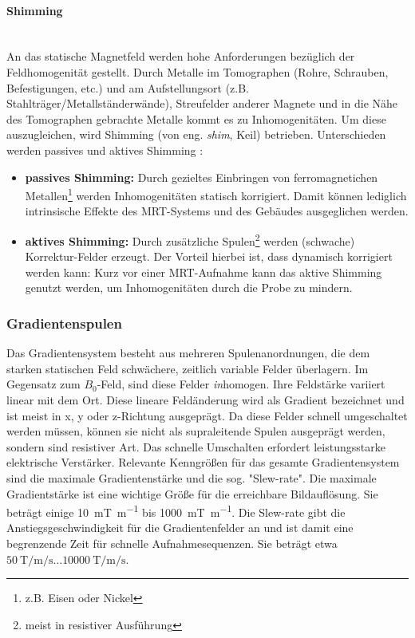 \paragraph{Shimming}\mbox{}\\
An das statische Magnetfeld werden hohe Anforderungen bezüglich der Feldhomogenität gestellt.
Durch Metalle im Tomographen (Rohre, Schrauben, Befestigungen, etc.) und am Aufstellungsort (z.B. Stahlträger/Metallständerwände), Streufelder anderer Magnete und in die Nähe des Tomographen gebrachte Metalle kommt es zu Inhomogenitäten.
Um diese auszugleichen, wird Shimming (von eng. \textit{shim}, Keil) betrieben. Unterschieden werden passives und aktives Shimming \cite{Lipton2008}:
\begin{itemize}
	\item \textbf{passives Shimming:} Durch gezieltes Einbringen von ferromagnetichen Metallen\footnote{z.B. Eisen oder Nickel} werden Inhomogenitäten statisch korrigiert. Damit können lediglich intrinsische Effekte des MRT-Systems und des Gebäudes ausgeglichen werden.
	\item \textbf{aktives Shimming:} Durch zusätzliche Spulen\footnote{meist in resistiver Ausführung} werden (schwache) Korrektur-Felder erzeugt. Der Vorteil hierbei ist, dass dynamisch korrigiert werden kann: Kurz vor einer MRT-Aufnahme kann das aktive Shimming genutzt werden, um Inhomogenitäten  durch die Probe zu mindern.  
\end{itemize}

\subsubsection{Gradientenspulen}
Das Gradientensystem besteht aus mehreren Spulenanordnungen, die dem starken statischen Feld schwächere, zeitlich variable Felder überlagern. Im Gegensatz zum $B_0$-Feld, sind diese Felder \textit{in}homogen. Ihre Feldstärke variiert linear mit dem Ort. Diese lineare Feldänderung wird als Gradient bezeichnet und ist meist in x, y oder z-Richtung ausgeprägt. Da diese Felder schnell umgeschaltet werden müssen, können sie nicht als supraleitende Spulen ausgeprägt werden, sondern sind resistiver Art. Das schnelle Umschalten erfordert leistungsstarke elektrische Verstärker. Relevante Kenngrößen für das gesamte Gradientensystem sind die maximale Gradientenstärke und die sog. "Slew-rate". Die maximale Gradientstärke ist eine wichtige Größe für die erreichbare Bildauflösung. Sie beträgt einige \SI{10}{\milli\tesla\per\meter} bis \SI{1000}{\milli\tesla\per\meter}. Die Slew-rate gibt die Anstiegsgeschwindigkeit für die Gradientenfelder an und ist damit eine begrenzende Zeit für schnelle Aufnahmesequenzen. Sie beträgt etwa $\SI{50}{\tesla\per\meter\per\second} \dots \SI{10000}{\tesla\per\meter\per\second}$.

